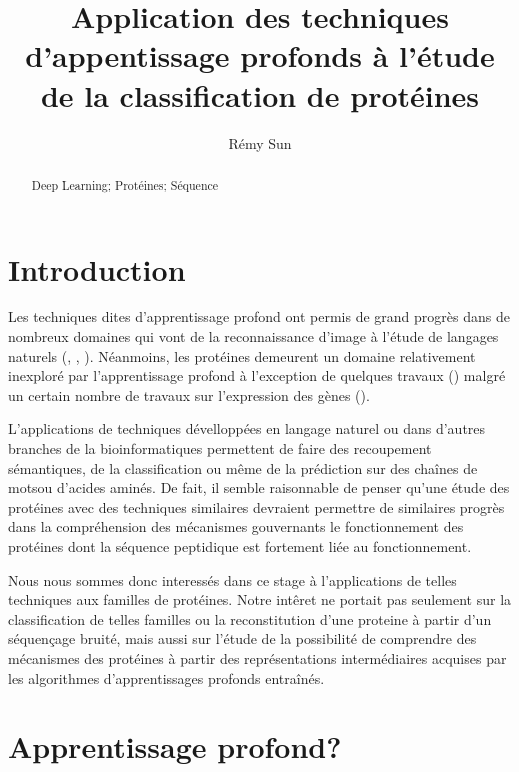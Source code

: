 \documentclass[a4paper,11pt, twocolumn]{article}
\title{Application des techniques d'appentissage profonds à l'étude de la
  classification de protéines}
\author{Rémy Sun}
\newenvironment{keywords}%
{\description\item[Mots-clés.]}%
{\enddescription}
\begin{document}
\maketitle

\begin{abstract}
  
  \begin{keywords}
    Deep Learning; Protéines; Séquence
  \end{keywords}
\end{abstract}

\section*{Introduction}

Les techniques dites d'apprentissage profond ont permis de grand progrès dans de
nombreux domaines qui vont de la reconnaissance d'image à l'étude de langages
naturels (\cite{DBLP:journals/corr/ChoMGBSB14}, \cite{socher2011semi}, \cite{NIPS2014_5346}). Néanmoins, les
protéines demeurent un domaine relativement inexploré par l'apprentissage
profond à l'exception de quelques travaux
(\cite{Spencer:2015:DLN:2817095.2817106}) malgré un certain nombre de travaux
sur l'expression des gènes (\cite{Gupta031906}).

L'applications de techniques dévelloppées en langage naturel ou dans d'autres
branches de la bioinformatiques permettent de faire des recoupement sémantiques,
de la classification ou même de la prédiction sur des chaînes de \og mots\fg ou
d'acides aminés. De fait, il semble raisonnable de penser qu'une étude des
protéines avec des techniques similaires devraient permettre de similaires
progrès dans la compréhension des mécanismes gouvernants le fonctionnement des
protéines dont la séquence peptidique est fortement liée au fonctionnement.

Nous nous sommes donc interessés dans ce stage à l'applications de telles techniques
aux familles de protéines. Notre intêret ne portait pas seulement sur la
classification de telles familles ou la reconstitution d'une proteine à partir
d'un séquençage bruité, mais aussi sur l'étude de la possibilité de comprendre
des mécanismes des protéines à partir des représentations intermédiaires acquises par les
algorithmes d'apprentissages profonds entraînés.

\section{Apprentissage profond?}
\end{document}
